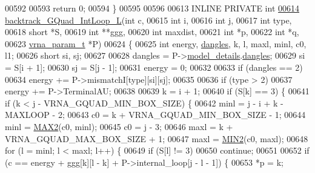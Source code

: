\begin{DoxyCode}
00592 
00593   \textcolor{keywordflow}{return} 0;
00594 \}
00595 
00596 
00613 INLINE PRIVATE \textcolor{keywordtype}{int}
\hyperlink{group__gquads_ga7b371308fa5a45c7ac353ef6ed1014de}{00614} \hyperlink{group__gquads_ga7b371308fa5a45c7ac353ef6ed1014de}{backtrack\_GQuad\_IntLoop\_L}(\textcolor{keywordtype}{int}           c,
00615                           \textcolor{keywordtype}{int}           i,
00616                           \textcolor{keywordtype}{int}           j,
00617                           \textcolor{keywordtype}{int}           type,
00618                           \textcolor{keywordtype}{short}         *S,
00619                           \textcolor{keywordtype}{int}           **ggg,
00620                           \textcolor{keywordtype}{int}           maxdist,
00621                           \textcolor{keywordtype}{int}           *p,
00622                           \textcolor{keywordtype}{int}           *q,
00623                           \hyperlink{group__energy__parameters_structvrna__param__s}{vrna\_param\_t}  *P)
00624 \{
00625   \textcolor{keywordtype}{int}   energy, \hyperlink{group__model__details_ga72b511ed1201f7e23ec437e468790d74}{dangles}, k, l, maxl, minl, c0, l1;
00626   \textcolor{keywordtype}{short} si, sj;
00627 
00628   dangles = P->\hyperlink{group__energy__parameters_a7b84353eb9075c595bad4ceb871bcae7}{model\_details}.\hyperlink{group__model__details_adcda4ff2ea77748ae0e8700288282efc}{dangles};
00629   si      = S[i + 1];
00630   sj      = S[j - 1];
00631   energy  = 0;
00632 
00633   \textcolor{keywordflow}{if} (dangles == 2)
00634     energy += P->mismatchI[type][si][sj];
00635 
00636   \textcolor{keywordflow}{if} (type > 2)
00637     energy += P->TerminalAU;
00638 
00639   k = i + 1;
00640   \textcolor{keywordflow}{if} (S[k] == 3) \{
00641     \textcolor{keywordflow}{if} (k < j - VRNA\_GQUAD\_MIN\_BOX\_SIZE) \{
00642       minl  = j - i + k - MAXLOOP - 2;
00643       c0    = k + VRNA\_GQUAD\_MIN\_BOX\_SIZE - 1;
00644       minl  = \hyperlink{group__utils_ga33297b3679c713b0c4d897cd0fe3b122}{MAX2}(c0, minl);
00645       c0    = j - 3;
00646       maxl  = k + VRNA\_GQUAD\_MAX\_BOX\_SIZE + 1;
00647       maxl  = \hyperlink{group__utils_gae0b9cd0ce090bd69b951aa73e8fa4f7d}{MIN2}(c0, maxl);
00648       \textcolor{keywordflow}{for} (l = minl; l < maxl; l++) \{
00649         \textcolor{keywordflow}{if} (S[l] != 3)
00650           \textcolor{keywordflow}{continue};
00651 
00652         \textcolor{keywordflow}{if} (c == energy + ggg[k][l - k] + P->internal\_loop[j - l - 1]) \{
00653           *p  = k;

\end{DoxyCode}
